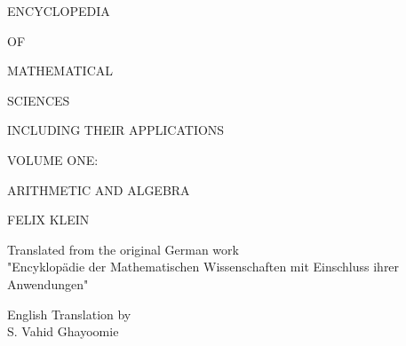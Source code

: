 \documentclass{article}
\begin{document}
\begin{center}
\vspace*{1cm}
{\fontsize{36}{42}\selectfont ENCYCLOPEDIA}

\vspace{0.5cm}
{\fontsize{24}{30}\selectfont OF}

\vspace{0.5cm}
{\fontsize{36}{42}\selectfont MATHEMATICAL}

\vspace{0.5cm}
{\fontsize{36}{42}\selectfont SCIENCES}

\vspace{1cm}
{\fontsize{18}{22}\selectfont INCLUDING THEIR APPLICATIONS}

\vspace{2cm}
{\fontsize{20}{26}\selectfont VOLUME ONE:}

\vspace{0.5cm}
{\fontsize{24}{30}\selectfont ARITHMETIC AND ALGEBRA}

\vspace{1.5cm}
{\fontsize{18}{22}\selectfont FELIX KLEIN}

\vspace{0.8cm}
{\fontsize{14}{16}\selectfont Translated from the original German work\\
"Encyklopädie der Mathematischen Wissenschaften mit Einschluss ihrer Anwendungen"}

\vspace{0.8cm}
{\fontsize{16}{20}\selectfont English Translation by\\[0.3cm]
S. Vahid Ghayoomie}

\end{center}
\end{document}
